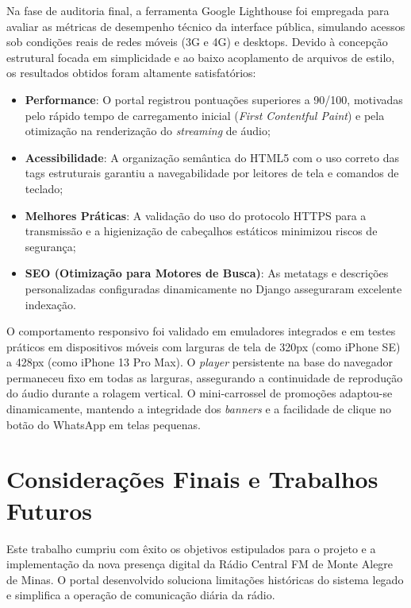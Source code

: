 \documentclass[12pt, openright, oneside, a4paper, brazil]{ads-unipac-abntex2}
\begin{document}
Na fase de auditoria final, a ferramenta Google Lighthouse \cite{google2026} foi empregada para avaliar as métricas de desempenho técnico da interface pública, simulando acessos sob condições reais de redes móveis (3G e 4G) e desktops. Devido à concepção estrutural focada em simplicidade e ao baixo acoplamento de arquivos de estilo, os resultados obtidos foram altamente satisfatórios:
\begin{itemize}
    \item \textbf{Performance}: O portal registrou pontuações superiores a 90/100, motivadas pelo rápido tempo de carregamento inicial (\textit{First Contentful Paint}) e pela otimização na renderização do \textit{streaming} de áudio;
    \item \textbf{Acessibilidade}: A organização semântica do HTML5 com o uso correto das tags estruturais garantiu a navegabilidade por leitores de tela e comandos de teclado;
    \item \textbf{Melhores Práticas}: A validação do uso do protocolo HTTPS para a transmissão e a higienização de cabeçalhos estáticos minimizou riscos de segurança;
    \item \textbf{SEO (Otimização para Motores de Busca)}: As metatags e descrições personalizadas configuradas dinamicamente no Django asseguraram excelente indexação.
\end{itemize}

O comportamento responsivo foi validado em emuladores integrados e em testes práticos em dispositivos móveis com larguras de tela de 320px (como iPhone SE) a 428px (como iPhone 13 Pro Max). O \textit{player} persistente na base do navegador permaneceu fixo em todas as larguras, assegurando a continuidade de reprodução do áudio durante a rolagem vertical. O mini-carrossel de promoções adaptou-se dinamicamente, mantendo a integridade dos \textit{banners} e a facilidade de clique no botão do WhatsApp em telas pequenas.

\chapter{Considerações Finais e Trabalhos Futuros}

Este trabalho cumpriu com êxito os objetivos estipulados para o projeto e a implementação da nova presença digital da Rádio Central FM de Monte Alegre de Minas. O portal desenvolvido soluciona limitações históricas do sistema legado e simplifica a operação de comunicação diária da rádio.
\end{document}

